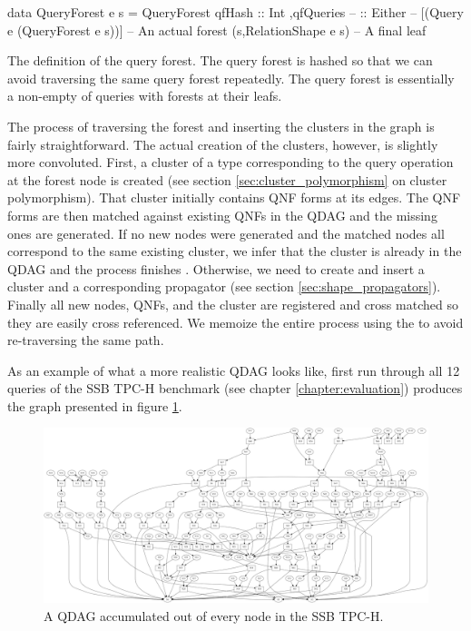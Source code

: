 \begin{code}
  \begin{haskellcode}
    data QueryForest e s =
      QueryForest
      { qfHash :: Int
        ,qfQueries --
        :: Either --
        [(Query e (QueryForest e s))] -- An actual forest
        (s,RelationShape e s) -- A final leaf
      }
  \end{haskellcode}

  \caption{\label{lst:query_forest}The definition of the query forest. The
    query forest is hashed so that we can avoid traversing the same
    query forest repeatedly. The query forest is essentially a
    non-empty of queries with forests at their leafs.}
\end{code}

The process of traversing the forest and inserting the clusters in the
graph is fairly straightforward. The actual creation of the clusters,
however, is slightly more convoluted. First, a cluster of a type
corresponding to the query operation at the forest node is created
(see section \ref{sec:cluster_polymorphism} on cluster
polymorphism). That cluster initially contains QNF forms at its
edges. The QNF forms are then matched against existing QNFs in the
QDAG and the missing ones are generated. If no new nodes were
generated and the matched nodes all correspond to the same existing
cluster, we infer that the cluster is already in the QDAG and the
process finishes . Otherwise, we need to create and insert a cluster
and a corresponding propagator (see section
\ref{sec:shape_propagators}). Finally all new nodes, QNFs, and the
cluster are registered and cross matched so they are easily cross
referenced.  We memoize the entire process using the  to
avoid re-traversing the same path.

As an example of what a more realistic QDAG looks like, first run
through all 12 queries of the SSB TPC-H benchmark (see chapter
\ref{chapter:evaluation}) produces the graph presented in figure
\ref{fig:ssb_graph}.

\begin{figure}[H]
  \centering
  \includegraphics[width=\textwidth]{./imgs/ssb_graph.pdf}
  \caption{\label{fig:ssb_graph}A QDAG accumulated out of every node
    in the SSB TPC-H.}
\end{figure}




